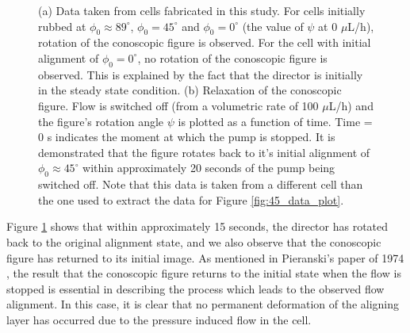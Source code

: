 \begin{figure}
\begin{center}
\end{center}
\caption[Conoscopic figure rotation for different $\phi_0$ and terminating flow]{\label{fig:time_relax} (a) Data taken from cells fabricated in this study. For cells initially rubbed at $\phi_0\approx89^{\circ}$, $\phi_0=45^{\circ}$ and $\phi_0=0^{\circ}$ (the value of $\psi$ at 0 $\mu$L/h), rotation of the conoscopic figure is observed. For the cell with initial alignment of $\phi_0=0^{\circ}$, no rotation of the conoscopic figure is observed. This is explained by the fact that the director is initially in the steady state condition. (b) Relaxation of the conoscopic figure. Flow is switched off (from a volumetric rate of 100 $\mu$L/h) and the figure's rotation angle $\psi$ is plotted as a function of time. Time = 0 s indicates the moment at which the pump is stopped. It is demonstrated that the figure rotates back to it's initial alignment of $\phi_0\approx45^{\circ}$ within approximately 20 seconds of the pump being switched off. Note that this data is taken from a different cell than the one used to extract the data for Figure \ref{fig:45_data_plot}.}
\end{figure}


Figure \ref{fig:time_relax} shows that within approximately 15 seconds, the director has rotated back to the original alignment state, and we also observe that the conoscopic figure has returned to its initial image. As mentioned in Pieranski's paper of 1974 \cite{Pieranski1974}, the result that the conoscopic figure returns to the initial state when the flow is stopped is essential in describing the process which leads to the observed flow alignment. In this case, it is clear that no permanent deformation of the aligning layer has occurred due to the pressure induced flow in the cell.

